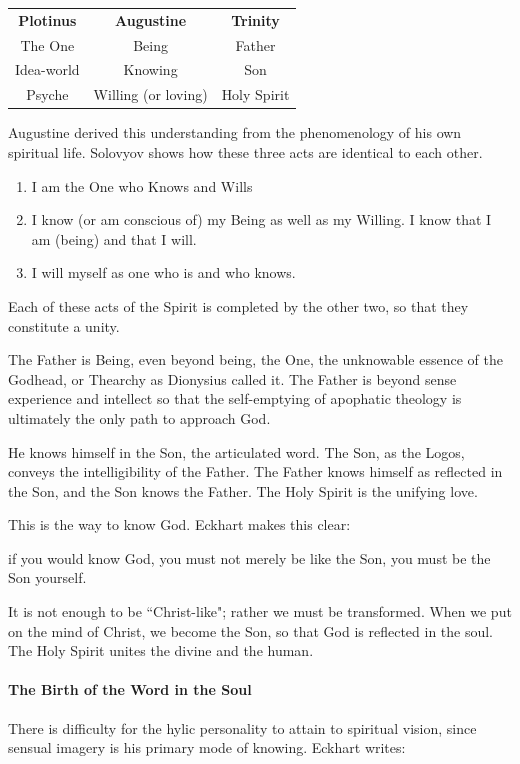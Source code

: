 \begin{table}[h]\centering\scriptsize
\begin{tabular}{ccc}\toprule
\textbf{Plotinus} &
\textbf{Augustine} &
\textbf{Trinity}\\
The One &
Being &
Father\\
Idea-world &
Knowing &
Son\\
Psyche &
Willing (or loving) &
Holy Spirit\\\bottomrule
\end{tabular}
\end{table}
Augustine derived this understanding from the phenomenology of his own spiritual life. Solovyov shows how these three acts are identical to each other.

\begin{enumerate}
\item I am the One who Knows and Wills 
\item I know (or am conscious of) my Being as well as my Willing. I know that I am (being) and that I will. 
\item I will myself as one who is and who knows. 
\end{enumerate}
Each of these acts of the Spirit is completed by the other two, so that they constitute a unity.

The Father is Being, even beyond being, the One, the unknowable essence of the Godhead, or Thearchy as Dionysius called it. The Father is beyond sense experience and intellect so that the self-emptying of apophatic theology is ultimately the only path to approach God.

He knows himself in the Son, the articulated word. The Son, as the Logos, conveys the intelligibility of the Father. The Father knows himself as reflected in the Son, and the Son knows the Father. The Holy Spirit is the unifying love.

This is the way to know God. Eckhart makes this clear:

\begin{quotex}
if you would know God, you must not merely be like the Son, you must be the Son yourself. 

\end{quotex}
It is not enough to be ``Christ-like"; rather we must be transformed. When we put on the mind of Christ, we become the Son, so that God is reflected in the soul. The Holy Spirit unites the divine and the human.

\paragraph{The Birth of the Word in the Soul}
There is difficulty for the hylic personality to attain to spiritual vision, since sensual imagery is his primary mode of knowing. Eckhart writes:

